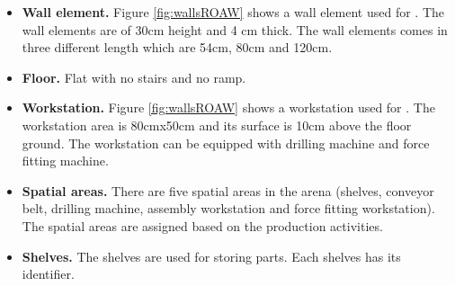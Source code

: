 \begin{itemize}
 \item \textbf{Wall element.} Figure \ref{fig:wallsROAW} shows a wall element used for \roaw. The wall elements are of 30cm height and 4 cm thick. The wall elements comes in three different length which are 54cm, 80cm and 120cm.
 \item \textbf{Floor.} Flat with no stairs and no ramp.
 \item \textbf{Workstation.} Figure \ref{fig:wallsROAW} shows a workstation used for \roaw. The workstation area is 80cmx50cm and its surface is 10cm above the floor ground.
 The workstation can be equipped with drilling machine and  force fitting machine.
 \item \textbf{Spatial areas.} There are five spatial areas in the \roaw arena (shelves, conveyor belt, drilling machine, assembly workstation and force fitting workstation). The spatial areas are assigned based on the production activities.
 \item  \textbf{Shelves.} The shelves are used for storing parts. Each shelves has its identifier.
\end{itemize}